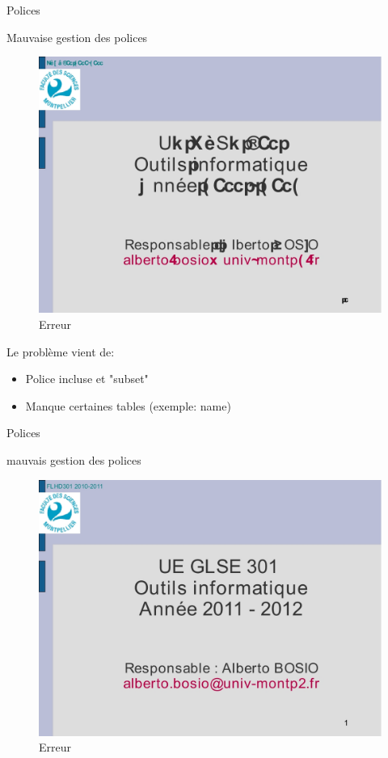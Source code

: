 \begin{frame}{Polices}

	\begin{block}{Mauvaise gestion des polices}
		\begin{figure}[h]
        		\begin{center}
         		\includegraphics[scale=0.17]{images/fail2.jpg} 
        		\end{center}
        		\caption{Erreur}
        		\label{Erreur}
    		\end{figure}
	\end{block}
\end{frame}

\begin{frame}{}
Le problème vient de:
\begin{itemize}
\item Police incluse et "subset"
\item Manque certaines tables (exemple: name)
\end{itemize}	
\end{frame}

\begin{frame}{Polices}
	\begin{block}{mauvais gestion des polices}
		\begin{figure}[h]
        		\begin{center}
         		\includegraphics[scale=0.17]{images/succes.jpg} 
        		\end{center}
        		\caption{Erreur}
        		\label{Erreur}
    		\end{figure}
	\end{block}
\end{frame}
